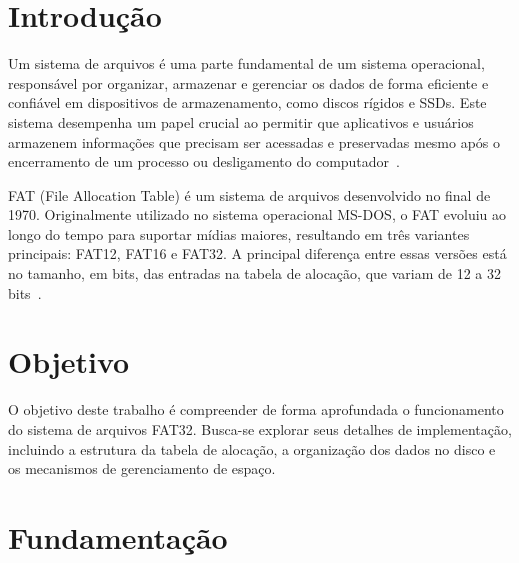 \documentclass[
    12pt,				%
    oneside,   	        %
    a4paper,			%
    english,			%
    french,				%
    spanish,			%
    brazil,				%
    ]{pacotes/abntex2}
\begin{document}
\tableofcontents*
\cleardoublepage

\textual

\makeatletter
\renewcommand{\chapter}{\@gobbletwo}
\makeatother

\section{Introdução}
\label{sec:introducao}

Um sistema de arquivos é uma parte fundamental de um sistema operacional, responsável por organizar, armazenar e gerenciar os dados de forma eficiente e confiável em dispositivos de armazenamento, como discos rígidos e SSDs. Este sistema  desempenha um papel crucial ao permitir que aplicativos e usuários armazenem informações que precisam ser acessadas e preservadas mesmo após o encerramento de um processo ou desligamento do computador~\cite{tanenbaum2016}.

FAT (File Allocation Table) é um sistema de arquivos desenvolvido no final de 1970. Originalmente utilizado no sistema operacional MS-DOS, o FAT evoluiu ao longo do tempo para suportar mídias maiores, resultando em três variantes principais: FAT12, FAT16 e FAT32. A principal diferença entre essas versões está no tamanho, em bits, das entradas na tabela de alocação, que variam de 12 a 32 bits~\cite{microsoft2000}.

\section{Objetivo}
\label{sec:objetivos}

O objetivo deste trabalho é compreender de forma aprofundada o funcionamento do sistema de arquivos FAT32. Busca-se explorar seus detalhes de implementação, incluindo a estrutura da tabela de alocação, a organização dos dados no disco e os mecanismos de gerenciamento de espaço.

\section{Fundamentação}
\label{sec:fundamentacao}
\end{document}
